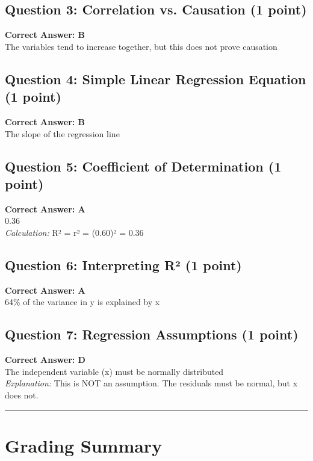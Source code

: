 \documentclass[10pt]{article}
\begin{document}
\subsection*{Question 3: Correlation vs. Causation (1 point)}
\textbf{Correct Answer: \textcolor{correctcolor}{B}}\\
The variables tend to increase together, but this does not prove causation

\subsection*{Question 4: Simple Linear Regression Equation (1 point)}
\textbf{Correct Answer: \textcolor{correctcolor}{B}}\\
The slope of the regression line

\subsection*{Question 5: Coefficient of Determination (1 point)}
\textbf{Correct Answer: \textcolor{correctcolor}{A}}\\
0.36\\
\textit{Calculation:} R² = r² = (0.60)² = 0.36

\subsection*{Question 6: Interpreting R² (1 point)}
\textbf{Correct Answer: \textcolor{correctcolor}{A}}\\
64\% of the variance in y is explained by x

\subsection*{Question 7: Regression Assumptions (1 point)}
\textbf{Correct Answer: \textcolor{correctcolor}{D}}\\
The independent variable (x) must be normally distributed\\
\textit{Explanation:} This is NOT an assumption. The residuals must be normal, but x does not.

\vspace{10pt}

\noindent\rule{\textwidth}{0.4pt}

\vspace{8pt}

\section*{Grading Summary}
\end{document}
